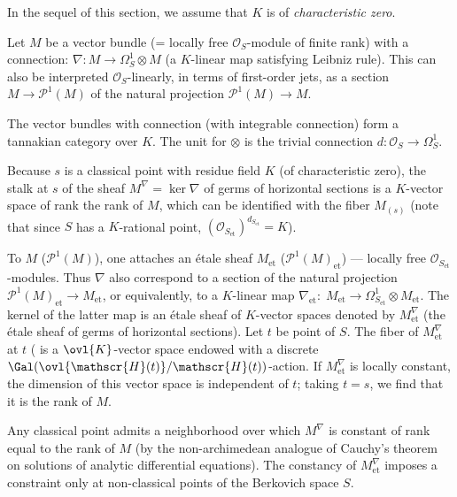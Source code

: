 In the sequel of this section, we assume that $K$ is of {\it
characteristic zero}.

\begin{para}\label{para::3.4.5} Let $M$ be a vector bundle (= locally free
 $\mathcal{O}_S$-module of finite rank) with a connection: $\nabla:
 M\to \Omega^1_S \otimes M$ (\ie a $K$-linear map satisfying Leibniz
 rule). This can also be interpreted $\mathcal{O}_S$-linearly, in terms
 of first-order jets, as a section $M\to \mathcal{P}^1(M)$ of the natural
 projection $\mathcal{P}^1(M)\to M$.

 \noindent The vector bundles with connection (\resp with integrable
 connection) form a tannakian category over $K$. The unit for $\otimes$
 is the trivial connection  $d: \mathcal{O}_S\to  \Omega^1_S $.

\medskip Because $s$ is a classical point with residue field $K$ (of
 characteristic zero), the stalk at $s$ of the sheaf $M^\nabla=\ker
 \nabla$ of germs of horizontal sections is a $K$-vector space of rank
 the rank of $M$, which can be identified with the fiber $M_{(s)}$ (note
 that since $S$ has a $K$-rational point, 
 $(\mathcal{O}_{S_{\mathrm{et}}})^{d_{S_{\mathrm{et}}}}=K$).

 \medskip To $M$ (\resp $\mathcal{P}^1(M)$), one attaches an \'etale sheaf
 $M_{\mathrm{et}}$ (\resp $\mathcal{P}^1(M)_{\mathrm{et}}$) --- locally free
 $\mathcal{O}_{S_{\mathrm{et}}}$-modules. Thus $\nabla$ also correspond
 to a section of the natural projection $\mathcal{P}^1(M)_{\mathrm{et}}\to 
 M_{\mathrm{et}}$, or equivalently, to a $K$-linear map
 $\nabla_{\mathrm{et}}: \;M_{\mathrm{et}}\to  \Omega^1_{S_{\mathrm{et}}}
 \otimes M_{\mathrm{et}}$. The kernel of the latter map is an \'etale
 sheaf of $K$-vector spaces denoted by $M_{\mathrm{et}}^\nabla$ (the
 \'etale sheaf of germs of horizontal sections). Let $t$ be point of
 $S$. The fiber of $M_{\mathrm{et}}^\nabla$ at $t$ (\cf
 \cite[4.2]{ecfnas} is a $\ovl{K}$-vector space endowed with a discrete
 $\Gal(\ovl{\mathscr{H}(t)}/{\mathscr{H}(t)})$-action. If
 $M_{\mathrm{et}}^\nabla$ is locally constant, the dimension of this
 vector space is independent of $t$; taking $t=s$, we find that it is
 the rank of $M$.  
\end{para}

 \medskip{} Any classical point admits a neighborhood
 over which $M^\nabla$ is constant of rank equal 
 to the rank of $M$ (by the non-archimedean analogue of Cauchy's theorem
 on solutions of analytic differential equations). 
 The constancy of $M_{\mathrm{et}}^\nabla$ imposes a constraint only at
 non-classical points of the Berkovich space $S$.  

